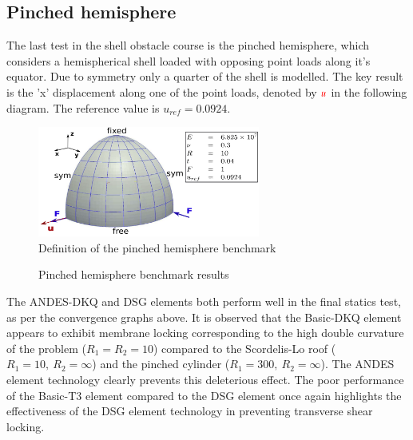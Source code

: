 \subsection{Pinched hemisphere}
%

The last test in the shell obstacle course is the pinched hemisphere, which considers a hemispherical shell loaded with opposing point loads along it's equator. Due to symmetry only a quarter of the shell is modelled. The key result is the 'x' displacement along one of the point loads, denoted by $\textcolor{red}{u}$ in the following diagram. The reference value is $u_{ref} =  0.0924$. 

\begin{figure}[H]
	\centering
	\def\svgwidth{\columnwidth}
	\includegraphics[width=7.3cm]{images/pinchedhemisphere.png}
	\caption{Definition of the pinched hemisphere benchmark \cite{Bou13}}
\end{figure}

\begin{figure}[H]
	\caption{\label{ref_label_overall}Pinched hemisphere benchmark results}
\end{figure}

The ANDES-DKQ and DSG elements both perform well in the final statics test, as per the convergence graphs above. It is observed that the Basic-DKQ element appears to exhibit membrane locking corresponding to the high double curvature of the problem ($R_1=R_2 = 10$) compared to the Scordelis-Lo roof ($R_1= 10,\ R_2 = \infty$) and the pinched cylinder ($R_1= 300,\ R_2 = \infty$). The ANDES element technology clearly prevents this deleterious effect. The poor performance of the Basic-T3 element compared to the DSG element once again highlights the effectiveness of the DSG element technology in preventing transverse shear locking.
\newpage
